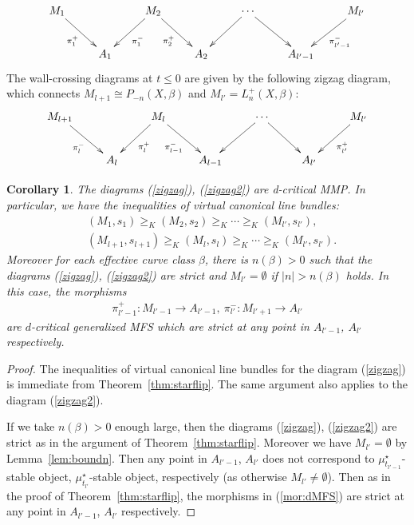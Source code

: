 \documentclass[11pt]{amsart}
\theoremstyle{plain}
\newtheorem{cor}[thm]{Corollary}
\theoremstyle{definition}
\theoremstyle{remark}
\begin{document}
\begin{align}\label{zigzag}
\xymatrix{
M_1 \ar[rd]_-{\pi_1^+}  &  &  M_2 \ar[ld]^-{\pi_1^-} \ar[rd]_-{\pi_2^+} &  & \cdots \ar[ld] \ar[rd] &
  &  M_{l'} \ar[ld]^-{\pi_{l'-1}^-}
\\
& A_1  & & A_2 & & A_{l'-1}  &
}
\end{align} 
The wall-crossing diagrams at $t\le 0$ are given by the following 
zigzag diagram, 
which connects $M_{l+1} \cong P_{-n}(X, \beta)$ and $M_{l'}=L_n^+(X, \beta)$: 
\begin{align}\label{zigzag2}
\xymatrix{
M_{l+1} \ar[rd]_-{\pi_{l}^-}  &  &  M_l \ar[ld]^-{\pi_l^+} 
\ar[rd]_-{\pi_{l-1}^-} &  & \cdots \ar[ld] \ar[rd] &
  &  M_{l'} \ar[ld]^-{\pi_{l'}^+}
\\
& A_{l}  & & A_{l-1} & & A_{l'}  &
}
\end{align} 



\begin{cor}\label{cor:zigzag}
The diagrams (\ref{zigzag}), (\ref{zigzag2}) are 
d-critical MMP. 
In particular, we have the inequalities of
virtual canonical line bundles: 
\begin{align*}
&(M_1, s_1) \ge_K (M_2, s_2) \ge_K \cdots \ge_K (M_{l'}, s_{l'}), \\
&(M_{l+1}, s_{l+1}) \ge_K (M_l, s_l) \ge_K \cdots \ge_K (M_{l'}, s_{l'}). 
\end{align*}
Moreover for each effective curve class $\beta$, there 
is $n(\beta)>0$ such that 
the diagrams (\ref{zigzag}), (\ref{zigzag2}) are strict
and $M_{l'}=\emptyset$
if  
$\lvert n \rvert >n(\beta)$ holds.
In this case, the morphisms
\begin{align}\label{mor:dMFS}
\pi_{l'-1}^+ \colon M_{l'-1} \to A_{l'-1}, \ 
\pi_{l'}^- \colon M_{l'+1} \to A_{l'}
\end{align}
are $d$-critical generalized MFS which are strict 
at any point in $A_{l'-1}$, $A_{l'}$ respectively. 
\end{cor}
\begin{proof}
The inequalities of
virtual canonical line bundles
 for the diagram (\ref{zigzag}) is immediate from 
Theorem~\ref{thm:starflip}. 
The same argument also applies to the diagram (\ref{zigzag2}). 

If we take $n(\beta)>0$ enough large, then 
the diagrams (\ref{zigzag}), (\ref{zigzag2}) 
are strict as in the argument of Theorem~\ref{thm:starflip}. 
Moreover we have $M_{l'}=\emptyset$ by Lemma~\ref{lem:boundn}. 
Then any point in $A_{l'-1}$, $A_{l'}$ does not correspond to 
$\mu_{t_{l'-1}}^{\star}$-stable object, 
$\mu_{t_{l'}}^{\star}$-stable object, 
respectively (as otherwise $M_{l'} \neq \emptyset$).
Then as in the proof of Theorem~\ref{thm:starflip}, 
the morphisms in (\ref{mor:dMFS}) are 
strict at any point in $A_{l'-1}$, $A_{l'}$ respectively. 
\end{proof}
\end{document}
